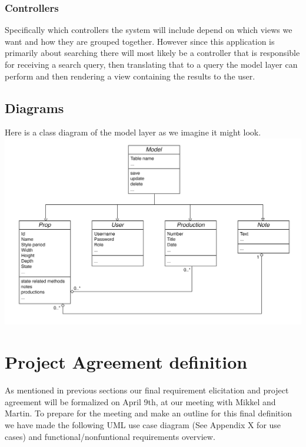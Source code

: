 \documentclass[12pt]{article}
\begin{document}
\subsubsection{Controllers}
Specifically which controllers the system will include depend on which views we
want and how they are grouped together. However since this application is
primarily about searching there will most likely be a controller that is
responsible for receiving a search query, then translating that to a query the
model layer can perform and then rendering a view containing the results to the
user.

\subsection{Diagrams}
Here is a class diagram of the model layer as we imagine it might look.
\newline
\newline
\includegraphics[scale=0.2]{class-diagram.png}

\section{Project Agreement definition}
As mentioned in previous sections our final requirement elicitation and project agreement will be formalized on April 9th, at our meeting with Mikkel and Martin. To prepare for the meeting and make an outline for this final definition we have made the following UML use case diagram (See Appendix X for use cases) and functional/nonfuntional requirements overview.
\end{document}
